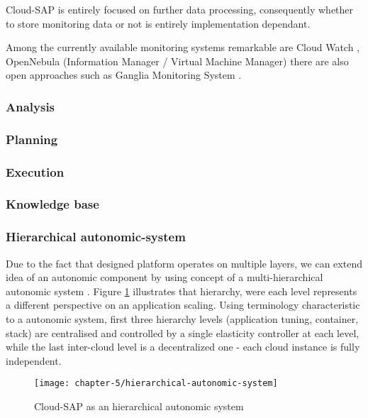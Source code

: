 Cloud-SAP is entirely focused on further data processing, consequently whether to store monitoring data or not is entirely implementation dependant.

Among the currently available monitoring systems remarkable are Cloud Watch \cite{CloudWatch}, OpenNebula (Information Manager / Virtual Machine Manager) \cite{OpenNebula} there are also open approaches such as Ganglia Monitoring System \cite{MaChCu04}.

\subsubsection{Analysis}


\subsubsection{Planning}

\subsubsection{Execution}

\subsubsection{Knowledge base}

\subsubsection{Hierarchical autonomic-system}
Due to the fact that designed platform operates on multiple layers, we can extend idea of an autonomic component by using concept of a multi-hierarchical autonomic system \cite{LiWoZh05}. Figure \ref{design:hierarchical-autonomic-system} illustrates that hierarchy, were each level represents a different perspective on an application scaling. Using terminology characteristic to a autonomic system, first three hierarchy levels (application tuning, container, stack) are centralised and controlled by a single elasticity controller at each level, while the last inter-cloud level is a decentralized one - each cloud instance is fully independent.

\begin{figure}[!ht]
  \begin{center}
    \texttt{[image: chapter-5/hierarchical-autonomic-system]}
  \end{center}
  \caption{Cloud-SAP as an hierarchical autonomic system}
  \label{design:hierarchical-autonomic-system}
\end{figure}


